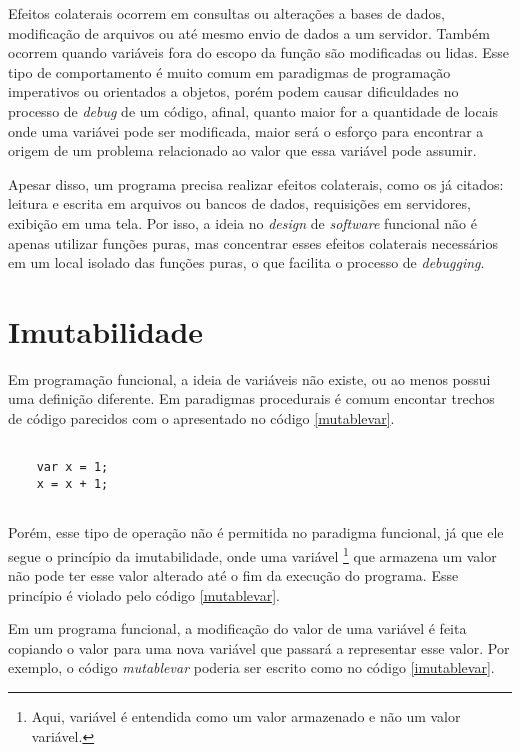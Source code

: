 Efeitos colaterais ocorrem em consultas ou 
alterações a bases de dados, modificação de 
arquivos ou até mesmo envio de dados a um 
servidor\cite{purefunctionscala, functionalscala}. 
Também ocorrem quando variáveis fora 
do escopo da função são modificadas ou lidas. 
Esse tipo de comportamento é muito comum em 
paradigmas de programação imperativos ou 
orientados a objetos, porém 
podem causar dificuldades no processo de 
\textit{debug} de um código, afinal, 
quanto maior for a quantidade de locais onde 
uma variávei pode ser modificada, maior 
será o esforço para encontrar a origem de 
um problema relacionado ao valor que essa 
variável pode assumir.

Apesar disso, um programa precisa realizar 
efeitos colaterais, como os já citados: 
leitura e escrita em arquivos ou bancos de 
dados, requisições em servidores, exibição em 
uma tela. Por isso, a ideia no \textit{design} de 
\textit{software} funcional não é apenas utilizar 
funções puras, mas concentrar esses efeitos 
colaterais necessários em um local isolado das 
funções puras, o que facilita o 
processo de \textit{debugging}\cite{purefunctionscala}.



\section{Imutabilidade}

Em programação funcional, a ideia de variáveis não 
existe, ou ao menos possui uma definição diferente\cite{braveclojure}.
Em paradigmas procedurais é comum encontar trechos 
de código parecidos com o apresentado no código \ref{mutablevar}.

\begin{lstlisting}[caption={Exemplo de Código Mutável},label=mutablevar]

    var x = 1;
    x = x + 1;


\end{lstlisting}

Porém, esse tipo de operação não é permitida no 
paradigma funcional, já que ele segue o princípio 
da imutabilidade, onde uma variável \footnote{Aqui, 
variável é entendida como um valor armazenado 
e não um valor variável.} que armazena um valor 
não pode ter esse valor alterado até o fim da 
execução do programa. Esse princípio é violado  
pelo código \ref{mutablevar}.

Em um programa funcional, a modificação do valor 
de uma variável é feita copiando o valor para uma 
nova variável que passará a representar esse valor\cite{functionalscala}.
Por exemplo, o código \textit{mutablevar} poderia ser 
escrito como no código \ref{imutablevar}.

